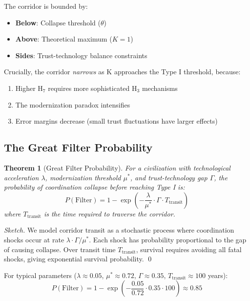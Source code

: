 \documentclass[11pt,a4paper]{article}
\newtheorem{theorem}{Theorem}
\begin{document}
The corridor is bounded by:
\begin{itemize}
    \item \textbf{Below}: Collapse threshold ($\theta$)
    \item \textbf{Above}: Theoretical maximum ($K = 1$)
    \item \textbf{Sides}: Trust-technology balance constraints
\end{itemize}

Crucially, the corridor \textit{narrows} as K approaches the Type I threshold, because:
\begin{enumerate}
    \item Higher H$_7$ requires more sophisticated H$_3$ mechanisms
    \item The modernization paradox intensifies
    \item Error margins decrease (small trust fluctuations have larger effects)
\end{enumerate}

\subsection{The Great Filter Probability}

\begin{theorem}[Great Filter Probability]
For a civilization with technological acceleration $\lambda$, modernization threshold $\mu^*$, and trust-technology gap $\Gamma$, the probability of coordination collapse before reaching Type I is:
\begin{equation}
P(\text{Filter}) = 1 - \exp\left(-\frac{\lambda}{\mu^*} \cdot \Gamma \cdot T_{\text{transit}}\right)
\end{equation}
where $T_{\text{transit}}$ is the time required to traverse the corridor.
\end{theorem}

\begin{proof}[Sketch]
We model corridor transit as a stochastic process where coordination shocks occur at rate $\lambda \cdot \Gamma / \mu^*$. Each shock has probability proportional to the gap of causing collapse. Over transit time $T_{\text{transit}}$, survival requires avoiding all fatal shocks, giving exponential survival probability. \qed
\end{proof}

For typical parameters ($\lambda \approx 0.05$, $\mu^* \approx 0.72$, $\Gamma \approx 0.35$, $T_{\text{transit}} \approx 100$ years):
\begin{equation}
P(\text{Filter}) = 1 - \exp\left(-\frac{0.05}{0.72} \cdot 0.35 \cdot 100\right) \approx 0.85
\end{equation}
\end{document}
